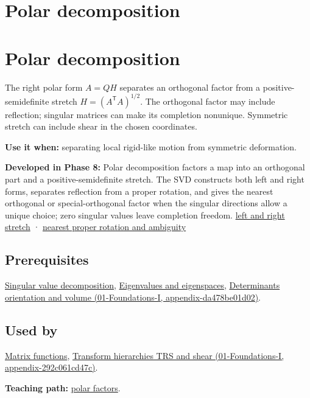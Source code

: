 \hypertarget{appendix-73f5bcf7a462}{}
\section*{Polar decomposition}
\section{Polar decomposition}\label{appendix-73f5bcf7a462-polar-decomposition}

The right polar form \(A=QH\) separates an orthogonal factor from a positive-semidefinite stretch \(H=(A^\mathsf T A)^{1/2}\). The orthogonal factor may include reflection; singular matrices can make its completion nonunique. Symmetric stretch can include shear in the chosen coordinates.

\textbf{Use it when:} separating local rigid-like motion from symmetric deformation.

\textbf{Developed in Phase 8:} Polar decomposition factors a map into an orthogonal part and a positive-semidefinite stretch. The SVD constructs both left and right forms, separates reflection from a proper rotation, and gives the nearest orthogonal or special-orthogonal factor when the singular directions allow a unique choice; zero singular values leave completion freedom. \hyperref[02-foundations-ii-ch024-polar-decomposition-separates-frame-dependent-stretch-from-orientation]{left and right stretch} · \hyperref[02-foundations-ii-ch024-two-sided-rotations-nearest-proper-rotation-and-nonunique-directions]{nearest proper rotation and ambiguity}

\subsection{Prerequisites}\label{appendix-73f5bcf7a462-prerequisites}

\hyperref[appendix-1fad5e7f36fa]{Singular value decomposition}, \hyperref[appendix-0b3be18411f9]{Eigenvalues and eigenspaces}, \href{../01-Foundations-I/main.pdf\#nameddest=appendix-da478be01d02}{Determinants orientation and volume (01-Foundations-I, appendix-da478be01d02)}.

\subsection{Used by}\label{appendix-73f5bcf7a462-used-by}

\hyperref[appendix-0f4bc2bf2b1f]{Matrix functions}, \href{../01-Foundations-I/main.pdf\#nameddest=appendix-292c061cd47c}{Transform hierarchies TRS and shear (01-Foundations-I, appendix-292c061cd47c)}.

\textbf{Teaching path:} \hyperref[02-foundations-ii-ch024-polar-decomposition-separates-rotation-like-motion-from-stretch]{polar factors}.
